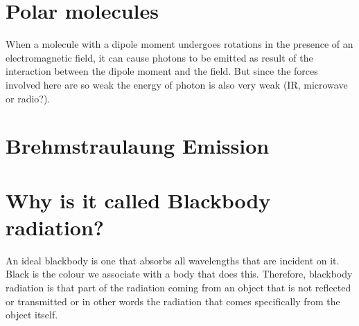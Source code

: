 \documentclass{../template/texnote}
\begin{document}
\section{Polar molecules}
When a molecule with a dipole moment undergoes rotations in the presence of an electromagnetic field, it can cause photons to be emitted as result of the interaction between the dipole moment and the field.
But since the forces involved here are so weak  the energy of photon is also very weak (IR, microwave or radio?).
\section{Brehmstraulaung Emission}
\section{Why is it called Blackbody radiation?}
An ideal blackbody is one that absorbs all wavelengths that are incident on it.
Black is the colour we associate with a body that does this.
Therefore, blackbody radiation is that part of the radiation coming from an object that is not reflected or transmitted or in other words the radiation that comes specifically from the object itself.
    \printbibliography
\end{document}
